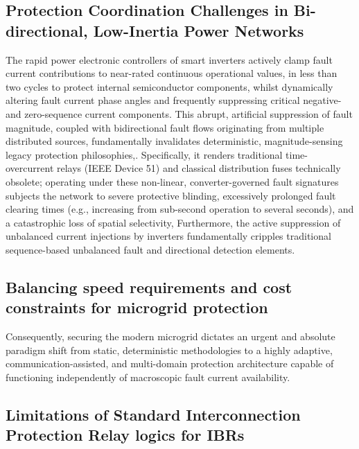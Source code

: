 \subsection{Protection Coordination Challenges in Bi-directional, Low-Inertia Power Networks}
 The rapid power electronic controllers of smart inverters actively clamp fault current contributions to near-rated continuous operational values,  in less than two cycles to protect internal semiconductor components, whilst dynamically altering fault current phase angles and frequently suppressing critical negative- and zero-sequence current components.
This abrupt, artificial suppression of fault magnitude, coupled with bidirectional fault flows originating from multiple distributed sources, fundamentally invalidates deterministic, magnitude-sensing legacy protection philosophies,. Specifically, it renders traditional time-overcurrent relays (IEEE Device 51) and classical distribution fuses technically obsolete; operating under these non-linear, converter-governed fault signatures subjects the network to severe protective blinding, excessively prolonged fault clearing times (e.g., increasing from sub-second operation to several seconds), and a catastrophic loss of spatial selectivity, Furthermore, the active suppression of unbalanced current injections by inverters fundamentally cripples traditional sequence-based unbalanced fault and directional detection elements.
\subsection{Balancing  speed requirements and cost constraints for microgrid protection}
Consequently, securing the modern microgrid dictates an urgent and absolute paradigm shift from static, deterministic methodologies to a highly adaptive, communication-assisted, and multi-domain protection architecture capable of functioning independently of macroscopic fault current availability.
\subsection{Limitations of Standard Interconnection Protection Relay logics for IBRs}


